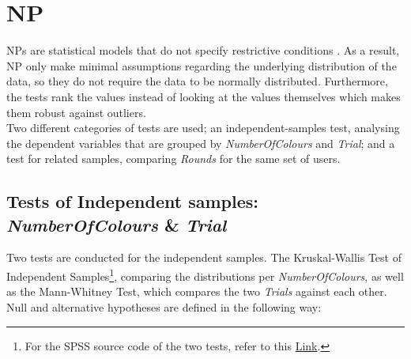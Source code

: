 %
%
\section{\acf{NP}}
\label{ch:Evaluation:sec:Non-parametrictest}

\acl{NP}s are statistical models that do not specify restrictive conditions \citep{Siegel1957}. As a result, \ac{NP} only make minimal assumptions regarding the underlying distribution of the data, so they do not require the data to be normally distributed. Furthermore, the tests rank the values instead of looking at the values themselves which makes them robust against outliers.\\
Two different categories of tests are used; an independent-samples test, analysing the dependent variables that are grouped by \textit{NumberOfColours} and \textit{Trial}; and a test for related samples, comparing \textit{Rounds} for the same set of users. 

\subsection{Tests of Independent samples: \textit{NumberOfColours} \& \textit{Trial}}
Two tests are conducted for the independent samples. The Kruskal-Wallis Test of Independent Samples\footnote{For the SPSS source code of the two tests, refer to this \href{http://publib.boulder.ibm.com/infocenter/spssstat/v20r0m0/topic/com.ibm.spss.statistics.help/alg_nonparametric_independent_wald-wolfowitz.htm}{Link}.}, comparing the distributions per \textit{NumberOfColours}, as well as the Mann-Whitney Test, which compares the two \textit{Trials} against each other.\\
Null and alternative hypotheses are defined in the following way: 

